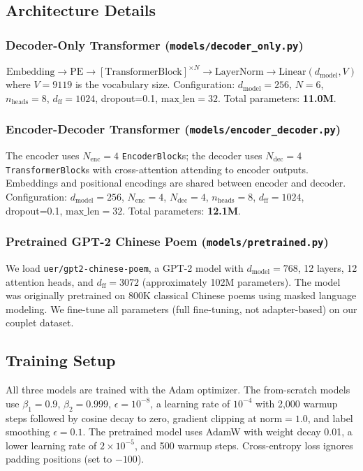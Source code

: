 \documentclass[11pt,a4paper]{article}
\begin{document}
\subsection{Architecture Details}
\label{sec:architectures}

\subsubsection*{Decoder-Only Transformer (\texttt{models/decoder\_only.py})}
\[
\text{Embedding} \to \text{PE} \to
    [\text{TransformerBlock}]^{\times N} \to
    \text{LayerNorm} \to \text{Linear}(d_{\text{model}}, V)
\]
where \(V = 9119\) is the vocabulary size.
Configuration: \(d_{\text{model}}=256\), \(N=6\), \(n_{\text{heads}}=8\),
\(d_{\text{ff}}=1024\), dropout=0.1, \(\text{max\_len}=32\).
Total parameters: \textbf{11.0M}.

\subsubsection*{Encoder-Decoder Transformer (\texttt{models/encoder\_decoder.py})}
The encoder uses \(N_{\text{enc}}=4\) \texttt{EncoderBlock}s;
the decoder uses \(N_{\text{dec}}=4\) \texttt{TransformerBlock}s with
cross-attention attending to encoder outputs.
Embeddings and positional encodings are shared between encoder and decoder.
Configuration: \(d_{\text{model}}=256\), \(N_{\text{enc}}=4\),
\(N_{\text{dec}}=4\), \(n_{\text{heads}}=8\), \(d_{\text{ff}}=1024\),
dropout=0.1, \(\text{max\_len}=32\).
Total parameters: \textbf{12.1M}.

\subsubsection*{Pretrained GPT-2 Chinese Poem (\texttt{models/pretrained.py})}
We load \texttt{uer/gpt2-chinese-poem}, a GPT-2 model with
\(d_{\text{model}}=768\), 12 layers, 12 attention heads, and
\(d_{\text{ff}}=3072\) (approximately 102M parameters).
The model was originally pretrained on 800K classical Chinese poems using
masked language modeling.
We fine-tune all parameters (full fine-tuning, not adapter-based) on our
couplet dataset.

\subsection{Training Setup}

All three models are trained with the Adam optimizer.
The from-scratch models use \(\beta_1=0.9\), \(\beta_2=0.999\),
\(\epsilon=10^{-8}\), a learning rate of \(10^{-4}\) with 2,000 warmup steps
followed by cosine decay to zero, gradient clipping at \(\text{norm}=1.0\),
and label smoothing \(\epsilon=0.1\).
The pretrained model uses AdamW with weight decay 0.01, a lower learning rate
of \(2\times 10^{-5}\), and 500 warmup steps.
Cross-entropy loss ignores padding positions (set to \(-100\)).
\end{document}

